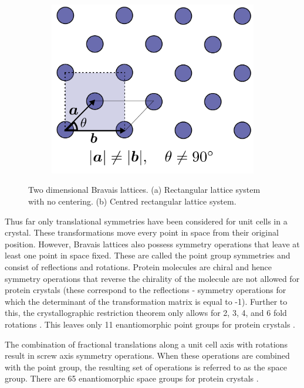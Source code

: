 \begin{figure}
\begin{subfigure}[b]{0.45\textwidth}
                    \includegraphics[width=\textwidth]{figures/introduction/centredrectangularbravaislattice.pdf}
                    \caption{}
                    \label{fig:2D centred rectangular Bravais lattice}
            \end{subfigure}
            \caption[Two dimensional Bravais lattices.]{Two dimensional Bravais lattices. (a) Rectangular lattice system with no centering. (b) Centred rectangular lattice system.}
    		\label{fig:2D Bravais lattices}
        \end{figure}

        Thus far only translational symmetries have been considered for unit cells in a crystal.
        These transformations move every point in space from their original position.
        However, Bravais lattices also possess symmetry operations that leave at least one point in space fixed.
        These are called the point group symmetries and consist of reflections and rotations.
        Protein molecules are chiral and hence symmetry operations that reverse the chirality of the molecule are not allowed for protein crystals (these correspond to the reflections - symmetry operations for which the determinant of the transformation matrix is equal to -1).
        Further to this, the crystallographic restriction theorem only allows for 2, 3, 4, and 6 fold rotations \cite[p~63]{coxeter1973regular}.
        This leaves only 11 enantiomorphic point groups for protein crystals \cite{drenth2012}.

        The combination of fractional translations along a unit cell axis with rotations result in screw axis symmetry operations.
        When these operations are combined with the point group, the resulting set of operations is referred to as the space group.
        There are 65 enantiomorphic space groups for protein crystals \cite{drenth2012}.

